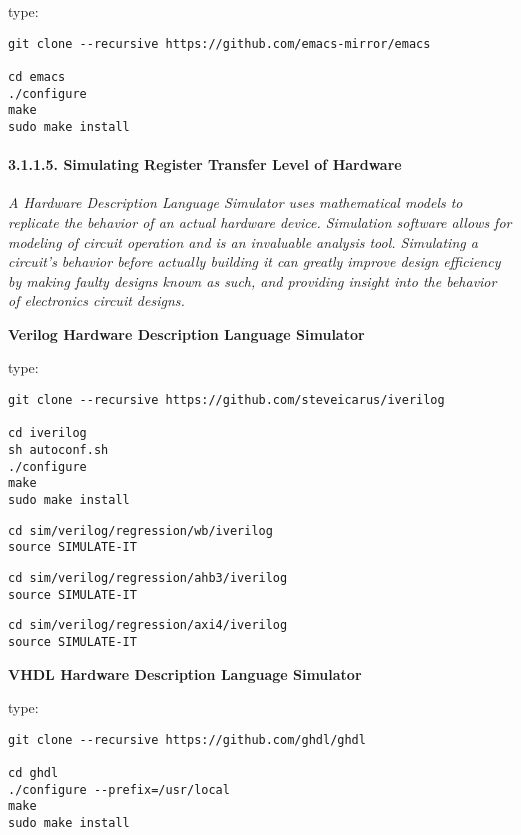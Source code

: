 \documentclass[]{article}
\let\oldparagraph\paragraph
\renewcommand{\paragraph}[1]{\oldparagraph{#1}\mbox{}}
\begin{document}
type:

\begin{verbatim}
git clone --recursive https://github.com/emacs-mirror/emacs

cd emacs
./configure
make
sudo make install
\end{verbatim}

\paragraph{3.1.1.5. Simulating Register Transfer Level of
Hardware}\label{simulating-register-transfer-level-of-hardware}

\emph{A Hardware Description Language Simulator uses mathematical models
to replicate the behavior of an actual hardware device. Simulation
software allows for modeling of circuit operation and is an invaluable
analysis tool. Simulating a circuit's behavior before actually building
it can greatly improve design efficiency by making faulty designs known
as such, and providing insight into the behavior of electronics circuit
designs.}

\textbf{Verilog Hardware Description Language Simulator}

type:

\begin{verbatim}
git clone --recursive https://github.com/steveicarus/iverilog

cd iverilog
sh autoconf.sh
./configure
make
sudo make install
\end{verbatim}

\begin{verbatim}
cd sim/verilog/regression/wb/iverilog
source SIMULATE-IT
\end{verbatim}

\begin{verbatim}
cd sim/verilog/regression/ahb3/iverilog
source SIMULATE-IT
\end{verbatim}

\begin{verbatim}
cd sim/verilog/regression/axi4/iverilog
source SIMULATE-IT
\end{verbatim}

\textbf{VHDL Hardware Description Language Simulator}

type:

\begin{verbatim}
git clone --recursive https://github.com/ghdl/ghdl

cd ghdl
./configure --prefix=/usr/local
make
sudo make install
\end{verbatim}
\end{document}
